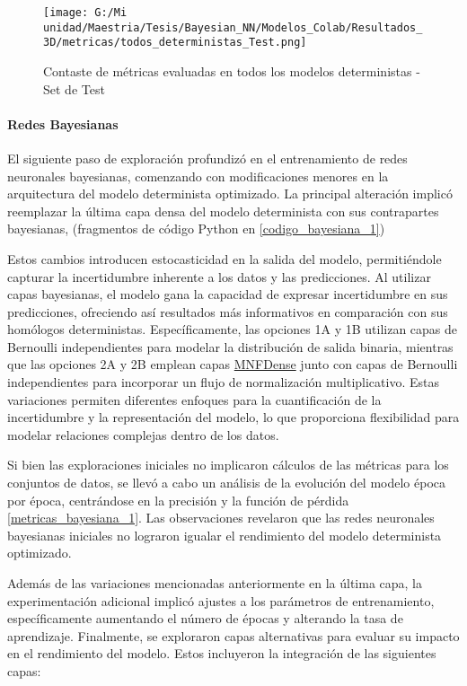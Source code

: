 \documentclass[10pt, oneside, a4paper]{article}
\begin{document}
	\begin{figure}[H]
	\centering
	\texttt{[image: G:/Mi unidad/Maestria/Tesis/Bayesian\_NN/Modelos\_Colab/Resultados\_3D/metricas/todos\_deterministas\_Test.png]}
	\caption{Contaste de métricas evaluadas en todos los modelos deterministas - Set de Test}
	\label{fig:deterministas_test_todos}
	\end{figure}

	\paragraph{Redes Bayesianas}

	El siguiente paso de exploración profundizó en el entrenamiento de redes neuronales bayesianas, comenzando con modificaciones menores en la arquitectura del modelo determinista optimizado. La principal alteración implicó reemplazar la última capa densa del modelo determinista con sus contrapartes bayesianas, (fragmentos de código Python en \ref{codigo_bayesiana_1})

	Estos cambios introducen estocasticidad en la salida del modelo, permitiéndole capturar la incertidumbre inherente a los datos y las predicciones. Al utilizar capas bayesianas, el modelo gana la capacidad de expresar incertidumbre en sus predicciones, ofreciendo así resultados más informativos en comparación con sus homólogos deterministas. Específicamente, las opciones 1A y 1B utilizan capas de Bernoulli independientes para modelar la distribución de salida binaria, mientras que las opciones 2A y 2B emplean capas \href{https://github.com/janosh/tf-mnf}{MNFDense} junto con capas de Bernoulli independientes para incorporar un flujo de normalización multiplicativo. Estas variaciones permiten diferentes enfoques para la cuantificación de la incertidumbre y la representación del modelo, lo que proporciona flexibilidad para modelar relaciones complejas dentro de los datos.

	Si bien las exploraciones iniciales no implicaron cálculos de las métricas para los conjuntos de datos, se llevó a cabo un análisis de la evolución del modelo época por época, centrándose en la precisión y la función de pérdida \ref{metricas_bayesiana_1}. Las observaciones revelaron que las redes neuronales bayesianas iniciales no lograron igualar el rendimiento del modelo determinista optimizado. 
	
	Además de las variaciones mencionadas anteriormente en la última capa, la experimentación adicional implicó ajustes a los parámetros de entrenamiento, específicamente aumentando el número de épocas y alterando la tasa de aprendizaje. Finalmente, se exploraron capas alternativas para evaluar su impacto en el rendimiento del modelo. Estos incluyeron la integración de las siguientes capas:
	
\end{document}
